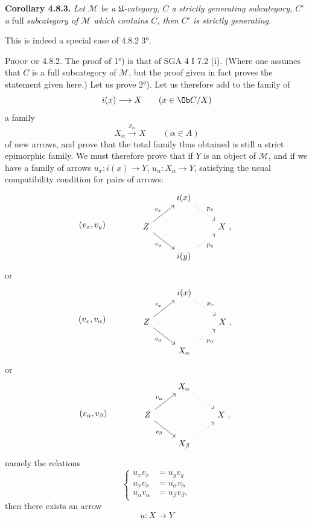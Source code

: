 \textbf{Corollary 4.8.3.} \textit{Let $\mathcal{M}$ be a $\mathfrak{U}$-category, $C$ a strictly generating subcategory, $C'$ a} full \textit{subcategory of $\mathcal{M}$ which contains $C$, then $C'$ is strictly generating.}

This is indeed a special case of 4.8.2 3°.


\textsc{Proof of 4.8.2}. The proof of 1°) is that of SGA 4 I 7.2 (i). (Where one assumes that $C$ is a full subcategory of $\mathcal{M}$, but the proof given in fact proves the statement given here.) Let us prove 2°). Let us therefore add to the family of
\[ i(x) \longrightarrow X \qquad (x \in \Ob C/X) \]
a family
\[ X_\alpha \xrightarrow{p_\alpha} X \qquad (\alpha \in A) \]
of new arrows, and prove that the total family thus obtained is still a strict epimorphic family. We must therefore prove that if $Y$ is an object of $\mathcal{M}$, and if we have a family of arrows $u_x : i(x) \longrightarrow Y$, $u_\alpha : X_\alpha \longrightarrow Y$, satisfying the usual compatibility condition for pairs of arrows:
\[ (v_x,v_y) \qquad\qquad \begin{tikzcd}
& i(x) \arrow[dr, dotted, "p_x"] & \\
Z \arrow[ur, "v_x"] \arrow[dr, "v_y"'] & & X\ , \\
& i(y) \arrow[ur, dotted, "p_y"'] &
\end{tikzcd} \]
or
\[ (v_x,v_\alpha) \qquad\qquad \begin{tikzcd}
& i(x) \arrow[dr, dotted, "p_x"] & \\
Z \arrow[ur, "v_x"] \arrow[dr, "v_\alpha"'] & & X\ , \\
& X_\alpha \arrow[ur, dotted, "p_\alpha"'] &
\end{tikzcd} \]
or
\[ (v_\alpha,v_\beta) \qquad\qquad \begin{tikzcd}
& X_\alpha \arrow[dr, dotted] & \\
Z \arrow[ur, "v_\alpha"] \arrow[dr, "v_\beta"'] & & X\ , \\
& X_\beta \arrow[ur, dotted] &
\end{tikzcd} \]
namely the relations
\[ \left\{\begin{aligned}
u_xv_x &= u_yv_y\\
u_xv_x &= u_\alpha v_\alpha\\
u_\alpha v_\alpha &= u_\beta v_\beta ,
\end{aligned}\right. \tag*{($*$)} \]
then there exists an arrow
\[ u : X \longrightarrow Y \]
